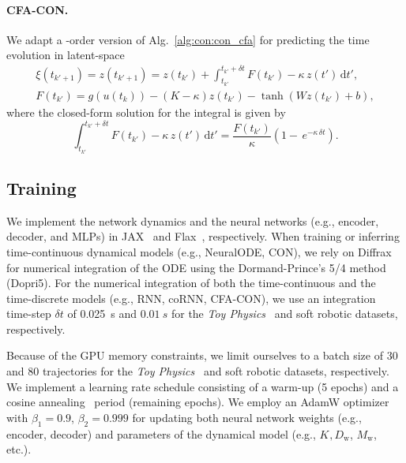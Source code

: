 \paragraph{CFA-CON.}
We adapt a -order version of Alg.~\ref{alg:con:con_cfa} for predicting the time evolution in latent-space
\begin{equation}
\begin{split}
    \xi(t_{k'+1}) = z(t_{k'+1}) = z(t_{k'}) + \int_{t_{k'}}^{t_{k'} + \delta t} F(t_{k'}) - \kappa \, z(t')  \, \mathrm{d}t',\\
    F(t_{k'}) = g(u(t_{k})) - (K - \kappa) z(t_{k'}) - \tanh(W z(t_{k'}) + b),
\end{split}
\end{equation}
where the closed-form solution for the integral is given by
\begin{equation}
    \int_{t_{k'}}^{t_{k'} + \delta t} F(t_{k'}) - \kappa \, z(t')  \, \mathrm{d}t' = \frac{F(t_{k'})}{\kappa} \left ( 1 - \, e^{- \kappa \, \delta t} \right ).
\end{equation}

\subsection{Training}
We implement the network dynamics and the neural networks (e.g., encoder, decoder, and \glspl{MLP}) in JAX~\citep{jax2018github} and Flax~\citep{flax2020github}, respectively. When training or inferring time-continuous dynamical models (e.g., NeuralODE, CON), we rely on Diffrax~\citep{kidger2021neural} for numerical integration of the \gls{ODE} using the Dormand-Prince's 5/4 method~\citep{dormand1980family} (Dopri5). For the numerical integration of both the time-continuous and the time-discrete models (e.g., RNN, \gls{coRNN}, \gls{CFA-CON}), we use an integration time-step $\delta t$ of \SI{0.025}{s} and $\SI{0.01}{s}$ for the \emph{Toy Physics}~\citep{botev2021priors} and soft robotic datasets, respectively.

Because of the GPU memory constraints, we limit ourselves to a batch size of $30$ and $80$ trajectories for the \emph{Toy Physics}~\citep{botev2021priors} and soft robotic datasets, respectively.
We implement a learning rate schedule consisting of a warm-up (5 epochs) and a cosine annealing~\citep{loshchilov2016sgdr} period (remaining epochs). 
We employ an AdamW optimizer~\citep{kingma2014adam, loshchilov2018decoupled} with $\beta_1 = 0.9$, $\beta_2 = 0.999$ for updating both neural network weights (e.g., encoder, decoder) and parameters of the dynamical model (e.g., $K_\mathrm{}, D_\mathrm{w}$, $M_\mathrm{w}$, etc.).

